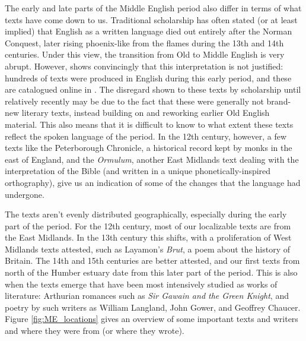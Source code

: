 The early and late parts of the Middle English period also differ in terms of what texts have come down to us. Traditional scholarship has often stated (or at least implied) that English as a written language died out entirely after the Norman Conquest, later rising phoenix-like from the flames during the 13th and 14th centuries. Under this view, the transition from Old to Middle English is very abrupt. However, \citet[Chapter 5]{Treharne2012} shows convincingly that this interpretation is not justified: hundreds of texts were produced in English during this early period, and these are catalogued online in \citet{DaRoldEtal2010}. The disregard shown to these texts by scholarship until relatively recently may be due to the fact that these were generally not brand-new literary texts, instead building on and reworking earlier Old English material. This also means that it is difficult to know to what extent these texts reflect the spoken language of the period. In the 12th century, however, a few texts like the Peterborough Chronicle, a historical record kept by monks in the east of England, and the \emph{Ormulum}, another East Midlands text dealing with the interpretation of the Bible (and written in a unique phonetically-inspired orthography), give us an indication of some of the changes that the language had undergone.

The texts aren't evenly distributed geographically, especially during the early part of the period. For the 12th century, most of our localizable texts are from the East Midlands. In the 13th century this shifts, with a proliferation of West Midlands texts attested, such as Layamon's \emph{Brut}, a poem about the history of Britain. The 14th and 15th centuries are better attested, and our first texts from north of the Humber estuary date from this later part of the period. This is also when the texts emerge that have been most intensively studied as works of literature: Arthurian romances such as \emph{Sir Gawain and the Green Knight}, and poetry by such writers as William Langland, John Gower, and Geoffrey Chaucer. Figure \ref{fig:ME_locations} gives an overview of some important texts and writers and where they were from (or where they wrote).

